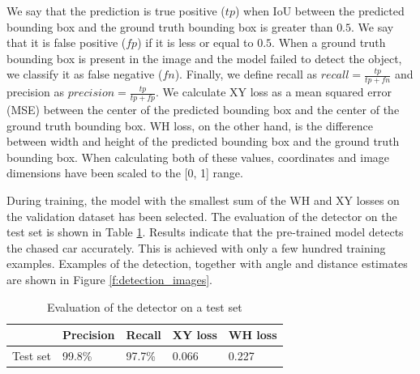 \documentclass{ctuthesis/ctuthesis}
\begin{document}

We say that the prediction is true positive ($tp$) when IoU between the predicted bounding box and the ground truth bounding box is greater than $0.5$. We say that it is false positive ($fp$) if it is less or equal to $0.5$. When a ground truth bounding box is present in the image and the model failed to detect the object, we classify it as false negative ($fn$). Finally, we define recall as $recall=\frac{tp}{tp+fn}$ and precision as $precision=\frac{tp}{tp+fp}$. We calculate XY loss as a mean squared error (MSE) between the center of the predicted bounding box and the center of the ground truth bounding box. WH loss, on the other hand, is the difference between width and height of the predicted bounding box and the ground truth bounding box. When calculating both of these values, coordinates and image dimensions have been scaled to the [0, 1] range. \par

During training, the model with the smallest sum of the WH and XY losses on the validation dataset has been selected. The evaluation of the detector on the test set is shown in Table \ref{tab:detection}. Results indicate that the pre-trained model detects the chased car accurately. This is achieved with only a few hundred training examples. Examples of the detection, together with angle and distance estimates are shown in Figure \ref{f:detection_images}. 

\begin{table}[]
\begin{tabular}{l|llll}
\hline
            & Precision & Recall & XY loss & WH loss \\ \hline
Test set & 99.8\%    & 97.7\% & 0.066   & 0.227   \\ \hline
\end{tabular}
\caption{Evaluation of the detector on a test set}\label{tab:detection}
\end{table}
\end{document}
